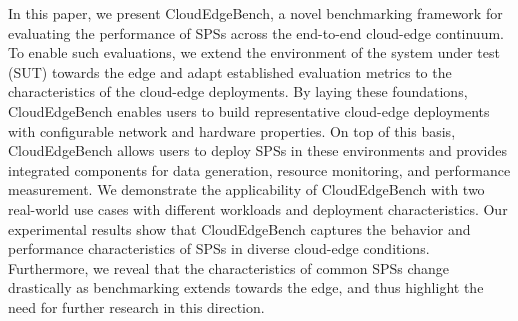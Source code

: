 \documentclass[runningheads]{llncs}
\begin{document}
In this paper, we present CloudEdgeBench, a novel benchmarking framework for evaluating the performance of SPSs across the end-to-end cloud-edge continuum.
To enable such evaluations, we extend the environment of the system under test (SUT) towards the edge and adapt established evaluation metrics to the characteristics of the cloud-edge deployments. 
By laying these foundations, CloudEdgeBench enables users to build representative cloud-edge deployments with configurable network and hardware properties.
On top of this basis, CloudEdgeBench allows users to deploy SPSs in these environments and provides integrated components for data generation, resource monitoring, and performance measurement. 
We demonstrate the applicability of CloudEdgeBench with two real-world use cases with different workloads and deployment characteristics.
Our experimental results show that CloudEdgeBench captures the behavior and performance characteristics of SPSs in diverse cloud-edge conditions.
Furthermore, we reveal that the characteristics of common SPSs change drastically as benchmarking extends towards the edge, and thus highlight the need for further research in this direction.
\end{document}
